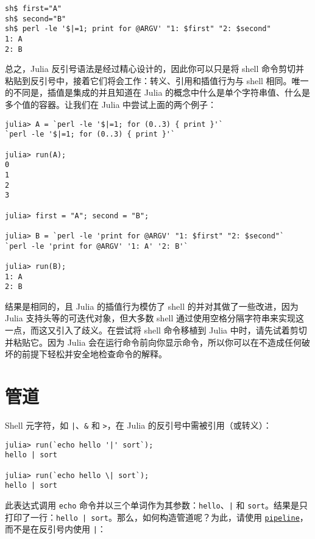\begin{lstlisting}
sh$ first="A"
sh$ second="B"
sh$ perl -le '$|=1; print for @ARGV' "1: $first" "2: $second"
1: A
2: B
\end{lstlisting}



总之，Julia 反引号语法是经过精心设计的，因此你可以只是将 shell 命令剪切并粘贴到反引号中，接着它们将会工作：转义、引用和插值行为与 shell 相同。唯一的不同是，插值是集成的并且知道在 Julia 的概念中什么是单个字符串值、什么是多个值的容器。让我们在 Julia 中尝试上面的两个例子：




\begin{verbatim}
julia> A = `perl -le '$|=1; for (0..3) { print }'`
`perl -le '$|=1; for (0..3) { print }'`

julia> run(A);
0
1
2
3

julia> first = "A"; second = "B";

julia> B = `perl -le 'print for @ARGV' "1: $first" "2: $second"`
`perl -le 'print for @ARGV' '1: A' '2: B'`

julia> run(B);
1: A
2: B
\end{verbatim}



结果是相同的，且 Julia 的插值行为模仿了 shell 的并对其做了一些改进，因为 Julia 支持头等的可迭代对象，但大多数 shell 通过使用空格分隔字符串来实现这一点，而这又引入了歧义。在尝试将 shell 命令移植到 Julia 中时，请先试着剪切并粘贴它。因为 Julia 会在运行命令前向你显示命令，所以你可以在不造成任何破坏的前提下轻松并安全地检查命令的解释。



\hypertarget{565642647898476823}{}


\section{管道}



Shell 元字符，如 \texttt{|}、\texttt{\&} 和 \texttt{>}，在 Julia 的反引号中需被引用（或转义）：




\begin{verbatim}
julia> run(`echo hello '|' sort`);
hello | sort

julia> run(`echo hello \| sort`);
hello | sort
\end{verbatim}



此表达式调用 \texttt{echo} 命令并以三个单词作为其参数：\texttt{hello}、\texttt{|} 和 \texttt{sort}。结果是只打印了一行：\texttt{hello | sort}。那么，如何构造管道呢？为此，请使用 \hyperlink{13500803391014570583}{\texttt{pipeline}}，而不是在反引号内使用 \texttt{{\textquotesingle}|{\textquotesingle}}：





